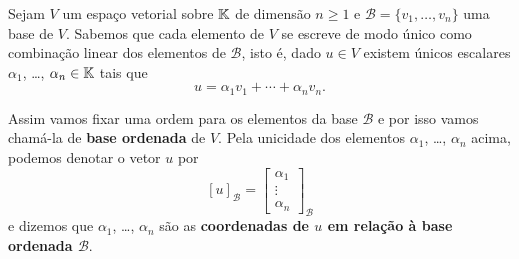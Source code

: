 Sejam $V$ um espa\c{c}o vetorial sobre $\mathbb{K}$ de dimens\~ao $n \ge 1$ e $\mathcal{B} = \{v_1,\dots,v_n\}$ uma base de $V$. Sabemos que cada elemento de $V$ se escreve de modo \'unico como combina\c{c}\~ao linear dos elementos de $\mathcal{B}$, isto \'e, dado $u \in V$ existem \'unicos escalares $\alpha_1$, \dots, $\alpha_n \in \mathbb{K}$ tais que
\[
  u = \alpha_1v_1 + \cdots + \alpha_nv_n.
\]

Assim vamos fixar uma ordem para os elementos da base $\mathcal{B}$ e por isso vamos cham\'a-la de \textbf{base ordenada} de $V$. Pela unicidade dos elementos $\alpha_1$, \dots, $\alpha_n$ acima, podemos denotar o vetor $u$ por
\[
  [u]_\mathcal{B} = \begin{bmatrix}
    \alpha_1\\
    \vdots\\
    \alpha_n
  \end{bmatrix}_\mathcal{B}
\]
e dizemos que $\alpha_1$, \dots, $\alpha_n$ s\~ao as \textbf{coordenadas de $u$ em rela\c{c}\~ao \`a base ordenada $\mathcal{B}$}.

